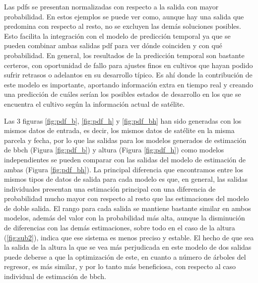 \par Las \gls{pdf}s se presentan normalizadas con respecto a la salida con mayor probabilidad. En estos ejemplos se puede ver como, aunque hay una salida que predomina con respecto al resto, no se excluyen las demás soluciones posibles. Esto facilita la integración con el modelo de predicción temporal ya que se pueden combinar ambas salidas \gls{pdf} para ver dónde coinciden y con qué probabilidad. En general, los resultados de la predicción temporal son bastante certeros, con oportunidad de fallo para ajustes finos en cultivos que hayan podido sufrir retrasos o adelantos en su desarrollo típico. Es ahí donde la contribución de este modelo es importante, aportando información extra en tiempo real y creando una predicción de cuáles serían los posibles estados de desarrollo en los que se encuentra el cultivo según la información actual de satélite. 
\\
\par Las 3 figuras \ref{fig:pdf_b}, \ref{fig:pdf_h} y \ref{fig:pdf_bh} han sido generadas con los mismos datos de entrada, es decir, los mismos datos de satélite en la misma parcela y fecha, por lo que las salidas para los modelos generados de estimación de \gls{bbch} (Figura \ref{fig:pdf_b}) y altura (Figura \ref{fig:pdf_h}) como modelos independientes se pueden comparar con las salidas del modelo de estimación de ambas (Figura \ref{fig:pdf_bh}). La principal diferencia que encontramos entre los mismos tipos de datos de salida para cada modelo es que, en general, las salidas individuales presentan una estimación principal con una diferencia de probabilidad mucho mayor con respecto al resto que las estimaciones del modelo de doble salida. El rango para cada salida se mantiene bastante similar en ambos modelos, además del valor con la probabilidad más alta, aunque la disminución de diferencias con las demás estimaciones, sobre todo en el caso de la altura (\ref{fig:sub2}), indica que ese sistema es menos preciso y estable. El hecho de que sea la salida de la altura la que se vea más perjudicada en este modelo de dos salidas puede deberse a que la optimización de este, en cuanto a número de árboles del regresor, es más similar, y por lo tanto más beneficiosa, con respecto al caso individual de estimación de \gls{bbch}.

